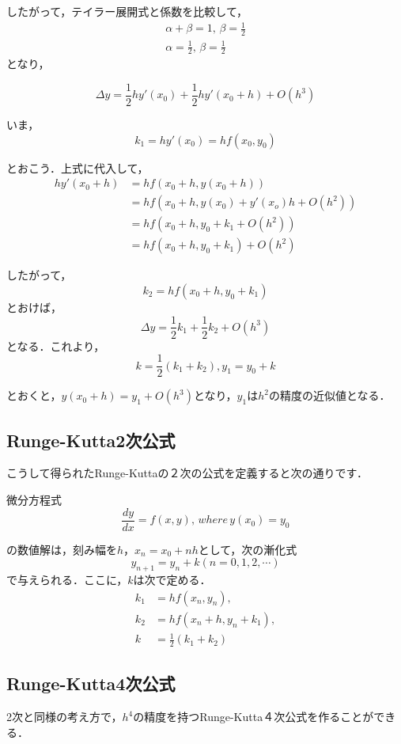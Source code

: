 \documentclass[11pt,dvipdfmx]{jsarticle}
\begin{document}
したがって，テイラー展開式と係数を比較して， \[
\begin{aligned}
\alpha + \beta = 1, \, \beta = \frac{1}{2}\\
\alpha = \frac{1}{2}, \, \beta =\frac{1}{2}
\end{aligned}\] となり，

\[
\Delta y = \frac{1}{2}hy'(x_0) + \frac{1}{2}hy'(x_0+h)+O(h^3)
\]

いま， \[
k_1 =hy'(x_0) =hf(x_0,y_0)
\]

とおこう．上式に代入して， \[
\begin{aligned}
hy'(x_0+h) &= hf(x_0+h,y(x_0+h)) \\
& =hf(x_0+h, y(x_0)+y'(x_o)h+O(h^2)) \\
& =hf(x_0+h, y_0+k_1+O(h^2)) \\
& =hf(x_0+h, y_0+k_1)+O(h^2)
\end{aligned}\]

したがって， \[
k_2 = hf(x_0+h, y_0+k_1)
\] とおけば， \[
\Delta y = \frac{1}{2}k_1 + \frac{1}{2}k_2 + O(h^3)
\] となる．これより， \[
k = \frac{1}{2}(k_1+k_2), y_1 = y_0 +k
\]

とおくと，\(y(x_0+h) = y_1+O(h^3)\)となり，\(y_1\)は\(h^2\)の精度の近似値となる．

    \subsection{Runge-Kutta2次公式}\label{runge-kutta2ux6b21ux516cux5f0f}

こうして得られたRunge-Kuttaの２次の公式を定義すると次の通りです．

微分方程式 \[
\frac{dy}{dx} = f(x,y), \, where \, y(x_0)=y_0
\]

の数値解は，刻み幅を\(h\)，\(x_n=x_0+nh\)として，次の漸化式 \[
y_{n+1} = y_n +k (n=0,1,2,\cdots)
\] で与えられる．ここに，\(k\)は次で定める． \[
\begin{aligned}
k_1 & = hf(x_n,y_n), \\
k_2 & = hf(x_n+h, y_n+k_1), \\
k & = \frac{1}{2}(k_1+k_2)
\end{aligned}
\]

    \subsection{Runge-Kutta4次公式}\label{runge-kutta4ux6b21ux516cux5f0f}

2次と同様の考え方で，\(h^4\)の精度を持つRunge-Kutta４次公式を作ることができる．
\end{document}
